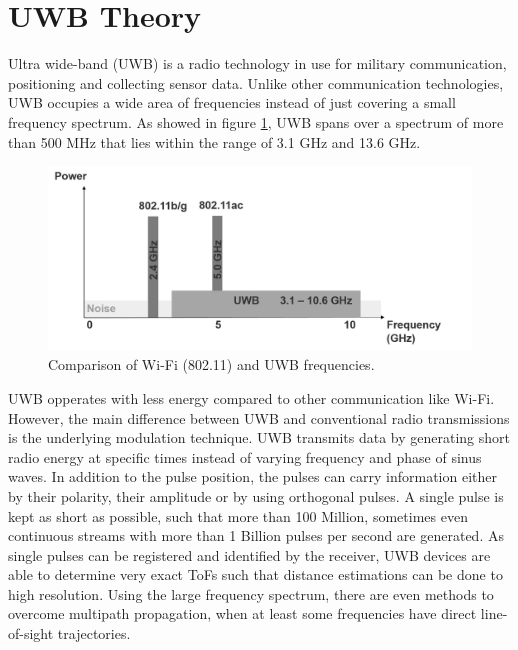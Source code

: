 
\section{UWB Theory}
Ultra wide-band (UWB) is a radio technology in use for military communication, positioning and collecting sensor data. Unlike other communication technologies, UWB occupies a wide area of frequencies instead of just covering a small frequency spectrum. As showed in figure \ref{fig:frequency_spectrum}, UWB spans over a spectrum of more than 500 MHz that lies within the range of 3.1 GHz and 13.6 GHz.
\begin{figure}[th]
\centering
\includegraphics[width=1.0\textwidth]{Figures/frequency_spectrum}
\decoRule
\caption[UWB frequency spectrum]{Comparison of Wi-Fi (802.11) and UWB frequencies.}
\label{fig:frequency_spectrum}
\end{figure}
UWB opperates with less energy compared to other communication like Wi-Fi. However, the main difference between UWB and conventional radio transmissions is the underlying modulation technique. UWB transmits data by generating short radio energy at specific times instead of varying frequency and phase of sinus waves. In addition to the pulse position, the pulses can carry information either by their polarity, their amplitude or by using orthogonal pulses.
A single pulse is kept as short as possible, such that more than 100 Million, sometimes even continuous streams with more than 1 Billion pulses per second are generated. As single pulses can be registered and identified by the receiver, UWB devices are able to determine very exact ToFs such that distance estimations can be done to high resolution. Using the large frequency spectrum, there are even methods to overcome multipath propagation, when at least some frequencies have direct line-of-sight trajectories.


